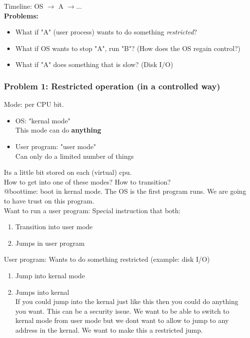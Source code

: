 Timeline: OS $\rightarrow$ A $\rightarrow \dots$\\

\textbf{Problems:}
\begin{itemize}
    \item What if "A" (user process) wants to do something
        \textit{restricted}?
    \item What if OS wants to stop "A", run "B"?
        (How does the OS regain control?)
    \item What if "A" does something that is slow? (Disk I/O)
\end{itemize}

\subsubsection{Problem 1: Restricted operation
(in a controlled way)}

Mode: per CPU bit.

\begin{itemize}
    \item OS: "kernal mode"\\
        This mode can do \textbf{anything}
    \item User program: "user mode"\\
        Can only do a limited number of things
\end{itemize}

Its a little bit stored on each (virtual) cpu.\\

How to get into one of these modes? How to transition?\\

@boottime: boot in kernal mode. The OS is the first program runs.
We are going to have trust on this program.\\

Want to run a user program: Special instruction that both:

\begin{enumerate}
    \item Transition into user mode
    \item Jumps in user program
\end{enumerate}

User program: Wants to do something restricted (example: disk I/O)

\begin{enumerate}
    \item Jump into kernal mode
    \item Jumps into kernal\\
        If you could jump into the kernal just like this then
        you could do anything you want. This can be a security
        issue. We want to be able to switch to kernal mode from 
        user mode but we dont want to allow to jump to any
        address in the kernal. We want to make this a restricted
        jump.
\end{enumerate}

